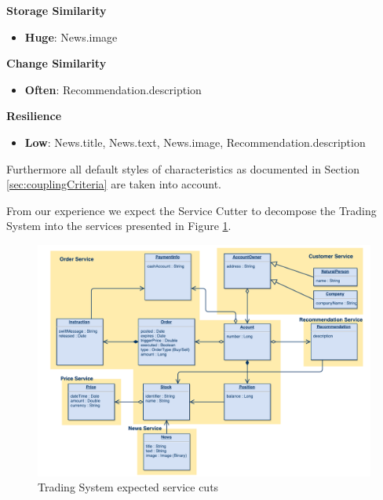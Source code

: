 \textbf{Storage Similarity}

\begin{itemize}
\item \textbf{Huge}: News.image
\end{itemize}

\textbf{Change Similarity}

\begin{itemize}
\item \textbf{Often}: Recommendation.description
\end{itemize}

\textbf{Resilience}

\begin{itemize}
\item \textbf{Low}: News.title, News.text, News.image, Recommendation.description
\end{itemize}

Furthermore all default styles of characteristics as documented in Section \ref{sec:couplingCriteria} are taken into account.

From our experience we expect the Service Cutter to decompose the Trading System into the services presented in Figure \ref{fig:tradingCuts}.

\begin{figure}[H]
	\includegraphics[scale=0.5]{diagrams/TradingSystem-ServiceCut.pdf}
	\caption{Trading System expected service cuts}
	\label{fig:tradingCuts}
\end{figure}

